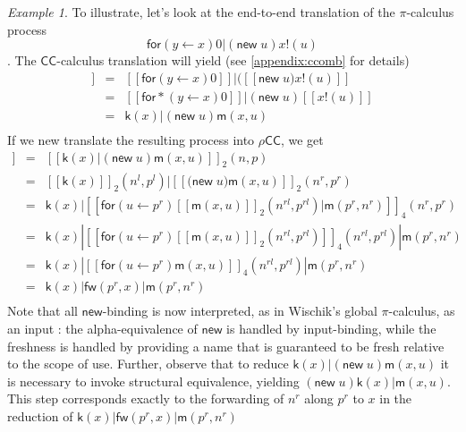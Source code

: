 \documentclass[submission,copyright,creativecommons]{eptcs}
\newcommand{\new}{\mathsf{new}}
\newcommand{\pic}{$\pi$-calculus}
\newcommand{\ccomb}{$\mathsf{CC}$-calculus}
\newcommand{\ldb}{[\![}
\newcommand{\rdb}{]\!]}
\newcommand{\binpar}[2]{#1 | #2}
\newcommand{\prefix}[3]{\mathsf{for}(#2 \leftarrow #1) #3}
\newcommand{\prefixst}[3]{\mathsf{for*}(#2 \leftarrow #1) #3}
\newcommand{\meaningof}[1]{\ldb #1 \rdb}
\newcommand{\rhocc}{$\rho$$\mathsf{CC}$}
\theoremstyle{definition}
\theoremstyle{remark}
\theoremstyle{remark}
\newtheorem{example}{Example}
\begin{document}
\begin{example}
  To illustrate, let's look at the end-to-end translation of the {\pic} process
  \[\binpar{\prefix{x}{y}{0}}{(\mathsf{new}\;u)x!(u)}\].
  The {\ccomb} translation will yield (see \ref{appendix:ccomb} for details)
\begin{eqnarray*}
  \meaningof{\binpar{\prefix{x}{y}{0}}{(\mathsf{new}\;u)x!(u)}} & = & \binpar{\meaningof{\prefix{x}{y}{0}}}{(\meaningof{\mathsf{new}\;u)x!(u)}} \\
  & = & \binpar{\meaningof{\prefixst{x}{y}{0}}}{(\mathsf{new}\;u)\meaningof{x!(u)}} \\
  & = & \binpar{\mathsf{k}(x)}{(\mathsf{new}\;u)\mathsf{m}(x,u)} \\
\end{eqnarray*}
If we new translate the resulting process into {\rhocc}, we get
\begin{eqnarray*}
  \meaningof{\binpar{\mathsf{k}(x)}{(\mathsf{new}\;u)\mathsf{m}(x,u)}} & = & \meaningof{\binpar{\mathsf{k}(x)}{(\mathsf{new}\;u)\mathsf{m}(x,u)}}_{2}(n,p)\\
  & = & \binpar{\meaningof{\mathsf{k}(x)}_{2}(n^{l},p^{l})}{\meaningof{\mathsf{(new}\;u)\mathsf{m}(x,u)}_{2}(n^{r},p^{r})} \\
  & = & \binpar{\mathsf{k}(x)}{\meaningof{\binpar{\prefix{p^{r}}{u}{\meaningof{\mathsf{m}(x,u)}_{2}(n^{rl},p^{rl})}}{\mathsf{m}(p^{r},n^{r})}}_{4}(n^{r},p^{r})} \\
  & = & \binpar{\mathsf{k}(x)}{\binpar{\meaningof{\prefix{p^{r}}{u}{\meaningof{\mathsf{m}(x,u)}_{2}(n^{rl},p^{rl})}}_{4}(n^{rl},p^{rl})}{\mathsf{m}(p^{r},n^{r})}} \\
  & = & \binpar{\mathsf{k}(x)}{\binpar{\meaningof{\prefix{p^{r}}{u}{\mathsf{m}(x,u)}}_{4}(n^{rl},p^{rl})}{\mathsf{m}(p^{r},n^{r})}} \\
  & = & \binpar{\mathsf{k}(x)}{\binpar{\mathsf{fw}(p^{r},x)}{\mathsf{m}(p^{r},n^{r})}} \\
\end{eqnarray*}
Note that all $\new$-binding is now interpreted, as in Wischik's
global $\pi$-calculus, as an input \cite{globalpi}: the
alpha-equivalence of $\new$ is handled by input-binding, while the
freshness is handled by providing a name that is guaranteed to be
fresh relative to the scope of use. Further, observe that to reduce
$\binpar{\mathsf{k}(x)}{(\mathsf{new}\;u)\mathsf{m}(x,u)}$ it is
necessary to invoke structural equivalence, yielding
$(\mathsf{new}\;u)\binpar{\mathsf{k}(x)}{\mathsf{m}(x,u)}$. This step
corresponds exactly to the forwarding of $n^{r}$ along $p^{r}$ to $x$ in the
reduction of
$\binpar{\mathsf{k}(x)}{\binpar{\mathsf{fw}(p^{r},x)}{\mathsf{m}(p^{r},n^{r})}}$
\end{example}
\end{document}
